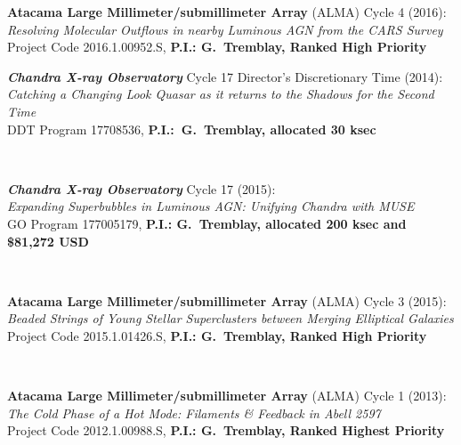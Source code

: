 \documentclass[11pt]{article}
\begin{document}
\vspace{4mm}


\hspace{42mm} \parbox{5.15in}{\textbf{Atacama Large Millimeter/submillimeter Array} (ALMA) Cycle 4 (2016):\\ \textit{ Resolving Molecular Outflows in nearby Luminous AGN from the CARS Survey} \\ Project Code 2016.1.00952.S, \textbf{P.I.: G.~Tremblay, Ranked High Priority}}

\vspace{4mm}

\hspace{42mm} \parbox{5.15in}{\textbf{\textit{Chandra X-ray Observatory}} Cycle 17 Director's Discretionary Time (2014): \\ \textit{Catching a Changing Look Quasar as it returns to the Shadows for the Second Time} \\ DDT Program 17708536, \textbf{P.I.:~G.~Tremblay, allocated 30 ksec}}\\

\vspace{4mm}

\hspace{42mm} \parbox{5.15in}{\textbf{\textit{Chandra X-ray Observatory}} Cycle 17 (2015): \\ \textit{Expanding Superbubbles in Luminous AGN: Unifying Chandra with MUSE} \\  GO Program 177005179, \textbf{P.I.: G.~Tremblay, allocated 200 ksec and \$81,272 USD}} \\


\vspace{4mm}

\hspace{42mm} \parbox{5.15in}{\textbf{Atacama Large Millimeter/submillimeter Array} (ALMA) Cycle 3 (2015): \\ \textit{Beaded Strings of Young Stellar Superclusters between Merging Elliptical Galaxies} \\  Project Code 2015.1.01426.S, \textbf{P.I.: G.~Tremblay, Ranked High Priority}} \\


\vspace{4mm}


\hspace{42mm} \parbox{5.15in}{\textbf{Atacama Large Millimeter/submillimeter Array} (ALMA) Cycle 1 (2013): \\ \textit{The Cold Phase of a Hot Mode: Filaments
\& Feedback in Abell 2597} \\  Project Code 2012.1.00988.S, \textbf{P.I.: G.~Tremblay, Ranked Highest Priority}} \\
\end{document}
